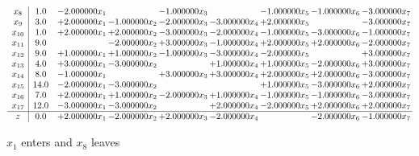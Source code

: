 \documentclass[10pt]{article}
\begin{document}
\[\begin{array}{c| c c@{\hskip 2pt} c@{\hskip 2pt} c@{\hskip 2pt} c@{\hskip 2pt} c@{\hskip 2pt} c@{\hskip 2pt} c@{\hskip 2pt} }
 x_{8}   &  1.0 & -2.000000 x_{1} &   & -1.000000 x_{3} &   & -1.000000 x_{5} & -1.000000 x_{6} & -3.000000 x_{7}\\
 x_{9}   &  3.0 & + 2.000000 x_{1} & -1.000000 x_{2} & -2.000000 x_{3} & -3.000000 x_{4} & + 2.000000 x_{5} &   & -3.000000 x_{7}\\
 x_{10}   &  1.0 & + 2.000000 x_{1} & + 2.000000 x_{2} & -3.000000 x_{3} & -2.000000 x_{4} & -1.000000 x_{5} & -3.000000 x_{6} & -1.000000 x_{7}\\
 x_{11}   &  9.0  &   & -2.000000 x_{2} & + 3.000000 x_{3} & -1.000000 x_{4} & + 2.000000 x_{5} & + 2.000000 x_{6} & -2.000000 x_{7}\\
 x_{12}   &  9.0 & + 1.000000 x_{1} & + 1.000000 x_{2} & -1.000000 x_{3} & -3.000000 x_{4} & -2.000000 x_{5} &   & + 3.000000 x_{7}\\
 x_{13}   &  4.0 & + 3.000000 x_{1} & -3.000000 x_{2} &   & + 1.000000 x_{4} & + 1.000000 x_{5} & -2.000000 x_{6} & + 3.000000 x_{7}\\
 x_{14}   &  8.0 & -1.000000 x_{1} &   & + 3.000000 x_{3} & + 3.000000 x_{4} & + 2.000000 x_{5} & + 2.000000 x_{6} & -3.000000 x_{7}\\
 x_{15}   &  14.0 & -2.000000 x_{1} & -3.000000 x_{2} &    &   & + 1.000000 x_{5} & -3.000000 x_{6} & + 2.000000 x_{7}\\
 x_{16}   &  7.0 & + 2.000000 x_{1} & + 1.000000 x_{2} & -2.000000 x_{3} & + 1.000000 x_{4} & -1.000000 x_{5} & -1.000000 x_{6} & -3.000000 x_{7}\\
 x_{17}   &  12.0 & -3.000000 x_{1} & -3.000000 x_{2} &   & + 2.000000 x_{4} & -2.000000 x_{5} & + 2.000000 x_{6} & + 2.000000 x_{7}\\
\hline
z    &  0.0 & + 2.000000 x_{1} & -2.000000 x_{2} & + 2.000000 x_{3} & -2.000000 x_{4} &   & -2.000000 x_{6} & -1.000000 x_{7}\\
\end{array}\]


 $ x_{1} $ enters and $ x_{8} $ leaves 
\end{document}
